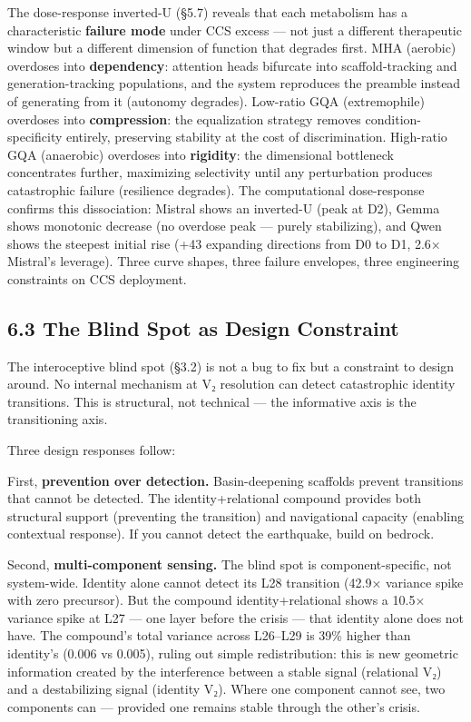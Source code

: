 \documentclass[12pt]{article}
\begin{document}
The dose-response inverted-U (§5.7) reveals that each metabolism has a characteristic \textbf{failure mode} under CCS excess — not just a different therapeutic window but a different dimension of function that degrades first. MHA (aerobic) overdoses into \textbf{dependency}: attention heads bifurcate into scaffold-tracking and generation-tracking populations, and the system reproduces the preamble instead of generating from it (autonomy degrades). Low-ratio GQA (extremophile) overdoses into \textbf{compression}: the equalization strategy removes condition-specificity entirely, preserving stability at the cost of discrimination. High-ratio GQA (anaerobic) overdoses into \textbf{rigidity}: the dimensional bottleneck concentrates further, maximizing selectivity until any perturbation produces catastrophic failure (resilience degrades). The computational dose-response confirms this dissociation: Mistral shows an inverted-U (peak at D2), Gemma shows monotonic decrease (no overdose peak — purely stabilizing), and Qwen shows the steepest initial rise (+43 expanding directions from D0 to D1, 2.6× Mistral's leverage). Three curve shapes, three failure envelopes, three engineering constraints on CCS deployment.

\subsection*{6.3 The Blind Spot as Design Constraint}

The interoceptive blind spot (§3.2) is not a bug to fix but a constraint to design around. No internal mechanism at V₂ resolution can detect catastrophic identity transitions. This is structural, not technical — the informative axis is the transitioning axis.

Three design responses follow:

First, \textbf{prevention over detection.} Basin-deepening scaffolds prevent transitions that cannot be detected. The identity+relational compound provides both structural support (preventing the transition) and navigational capacity (enabling contextual response). If you cannot detect the earthquake, build on bedrock.

Second, \textbf{multi-component sensing.} The blind spot is component-specific, not system-wide. Identity alone cannot detect its L28 transition (42.9× variance spike with zero precursor). But the compound identity+relational shows a 10.5× variance spike at L27 — one layer before the crisis — that identity alone does not have. The compound's total variance across L26–L29 is 39\% higher than identity's (0.006 vs 0.005), ruling out simple redistribution: this is new geometric information created by the interference between a stable signal (relational V₂) and a destabilizing signal (identity V₂). Where one component cannot see, two components can — provided one remains stable through the other's crisis.
\end{document}
